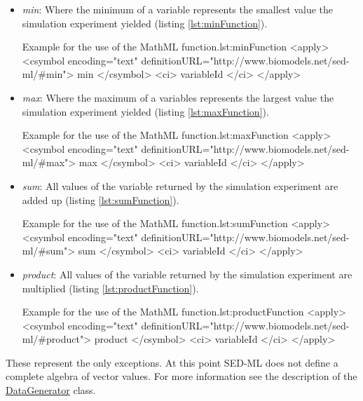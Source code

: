 \begin{itemize}\setlength{\parskip}{-0.1ex}

\item \emph{min}: Where the minimum of a variable represents the smallest value 
the simulation experiment yielded (listing \ref{lst:minFunction}). 
%
\begin{myXmlLst}{Example for the use of the MathML  function.}{lst:minFunction}
<apply>
 	<csymbol encoding="text" definitionURL="http://www.biomodels.net/sed-ml/#min">
 		min
 	</csymbol>
 	<ci> variableId </ci>
</apply>
\end{myXmlLst}

\item \emph{max}: Where the maximum of a variables represents the largest value 
the simulation experiment yielded (listing \ref{lst:maxFunction}).
%
\begin{myXmlLst}{Example for the use of the MathML  function.}{lst:maxFunction}
<apply>
 	<csymbol encoding="text" definitionURL="http://www.biomodels.net/sed-ml/#max">
 		max
 	</csymbol>
 	<ci> variableId </ci>
</apply>
\end{myXmlLst}

\item \emph{sum}: All values of the variable returned by the simulation 
experiment are added up (listing \ref{lst:sumFunction}).
%
\begin{myXmlLst}{Example for the use of the MathML  function.}{lst:sumFunction}
<apply>
 	<csymbol encoding="text" definitionURL="http://www.biomodels.net/sed-ml/#sum">
 		sum
 	</csymbol>
 	<ci> variableId </ci>
</apply>
\end{myXmlLst}


\item \emph{product}: All values of the variable returned by the simulation 
experiment are multiplied (listing \ref{lst:productFunction}).
%
\begin{myXmlLst}{Example for the use of the MathML  function.}{lst:productFunction}
<apply>
 	<csymbol encoding="text" definitionURL="http://www.biomodels.net/sed-ml/#product">
 		product
 	</csymbol>
 	<ci> variableId </ci>
</apply>
\end{myXmlLst}

\end{itemize}

These represent the only exceptions. At this point SED-ML \LoneVone does not define a complete algebra of vector values. For more information see the description of the \hyperref[class:dataGenerator]{DataGenerator} class.


